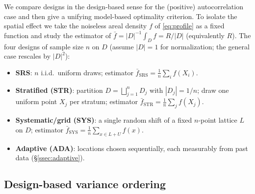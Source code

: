 \documentclass{amsart}
\theoremstyle{definition}
\begin{document}
We compare designs in the design-based sense for the (positive)
autocorrelation case and then give a unifying model-based optimality
criterion. To isolate the spatial effect we take the noiseless areal
density $f$ of \eqref{eq:profile} as a fixed function and study the
estimator of $\bar f=|D|^{-1}\int_D f=R/|D|$ (equivalently $R$). The four
designs of sample size $n$ on $D$ (assume $|D|=1$ for normalization; the
general case rescales by $|D|^2$):
\begin{itemize}
\item \textbf{SRS}: $n$ i.i.d.\ uniform draws; estimator
$\bar f_{\mathrm{SRS}}=\frac1n\sum_i f(X_i)$.
\item \textbf{Stratified (STR)}: partition $D=\bigsqcup_{j=1}^n D_j$ with
$|D_j|=1/n$; draw one uniform point $X_j$ per stratum; estimator
$\bar f_{\mathrm{STR}}=\frac1n\sum_j f(X_j)$.
\item \textbf{Systematic/grid (SYS)}: a single random shift of a fixed
$n$-point lattice $L$ on $D$; estimator
$\bar f_{\mathrm{SYS}}=\frac1n\sum_{x\in L+U}f(x)$.
\item \textbf{Adaptive (ADA)}: locations chosen sequentially, each
measurably from past data (\S\ref{ssec:adaptive}).
\end{itemize}

\subsection{Design-based variance ordering}
\end{document}
